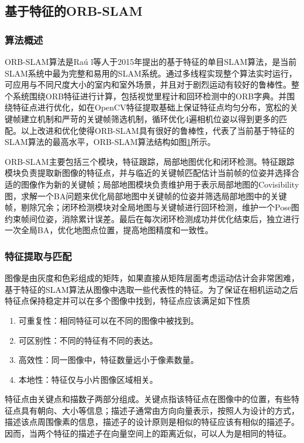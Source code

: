 \subsection{基于特征的ORB-SLAM}

\subsubsection*{算法概述}
ORB-SLAM算法是Ra\'u l等人于2015年提出的基于特征的单目SLAM算法，是当前SLAM系统中最为完整和易用的SLAM系统。通过多线程实现整个算法实时运行，可应用与不同尺度大小的室内和室外场景，并且对于剧烈运动有较好的鲁棒性。整个系统围绕ORB特征进行计算，包括视觉里程计和回环检测中的ORB字典。并围绕特征点进行优化，如在OpenCV特征提取基础上保证特征点均匀分布，宽松的关键帧建立机制和严苛的关键帧筛选机制，循环优化4遍相机位姿以得到更多的匹配。以上改进和优化使得ORB-SLAM具有很好的鲁棒性，代表了当前基于特征的SLAM算法的最高水平，ORB-SLAM算法结构如图\ref{fig3.6}所示。
\begin{figure}
\label{fig3.6}
\end{figure}

ORB-SLAM主要包括三个模块，特征跟踪，局部地图优化和闭环检测。特征跟踪模块负责提取新图像的特征点，并与临近的关键帧匹配估计当前帧的位姿并选择合适的图像作为新的关键帧；局部地图模块负责维护用于表示局部地图的Covisibility图，求解一个BA问题来优化局部地图中关键帧的位姿并筛选局部地图中的关键帧，剔除冗余；闭环检测模块对全局地图与关键帧进行回环检测，维护一个Pose图约束帧间位姿，消除累计误差。最后在每次闭环检测成功并优化结束后，独立进行一次全局BA，优化地图点位置，提高地图精度和一致性。


\subsubsection*{特征提取与匹配}
图像是由灰度和色彩组成的矩阵，如果直接从矩阵层面考虑运动估计会非常困难，基于特征的SLAM算法从图像中选取一些代表性的特征。为了保证在相机运动之后特征点保持稳定并可以在多个图像中找到，特征点应该满足如下性质
\begin{enumerate}[label={(\arabic*)}]
\item 可重复性：相同特征可以在不同的图像中被找到。
\item 可区别性：不同的特征有不同的表达。
\item 高效性：同一图像中，特征数量远小于像素数量。
\item 本地性：特征仅与小片图像区域相关。
\end{enumerate}

特征点由关键点和描数子两部分组成。关键点指该特征点在图像中的位置，有些特征点具有朝向、大小等信息；描述子通常由方向向量表示，按照人为设计的方式，描述该点周围像素的信息，描述子的设计原则是相似的特征应该有相似的描述子。因而，当两个特征的描述子在向量空间上的距离近似，可以人为是相同的特征。

